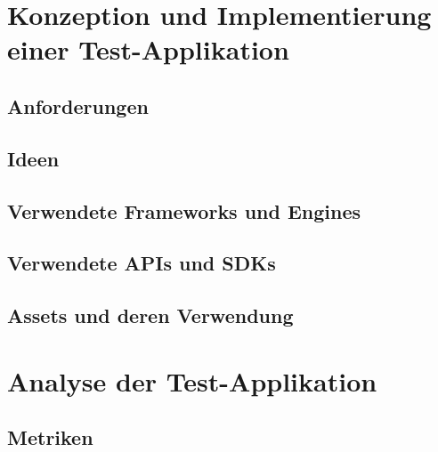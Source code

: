 

\chapter{Konzeption und Implementierung einer Test-Applikation}
\section{Anforderungen}
\section{Ideen}
\section{Verwendete Frameworks und Engines}
\section{Verwendete APIs und SDKs}
\section{Assets und deren Verwendung}

\chapter{Analyse der Test-Applikation}
\section{Metriken}
